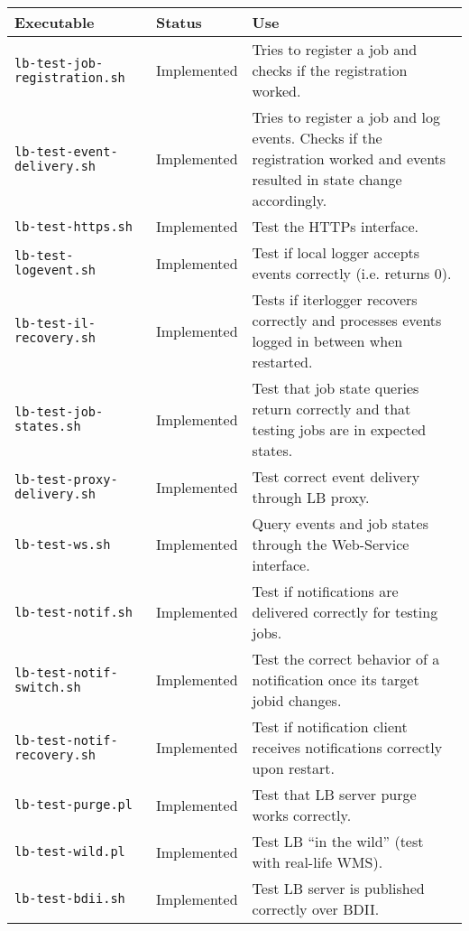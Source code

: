\begin{tabularx}{\textwidth}{|l|l|X|}
\hline
     {\bf Executable} & {\bf Status} & {\bf Use} \\
\hline
{\tt lb-test-job-registration.sh} & Implemented & Tries to register a job and checks if the registration worked. \\
\hline
{\tt lb-test-event-delivery.sh} & Implemented & Tries to register a job and log events. Checks if the registration worked and events resulted in state change accordingly. \\
\hline
{\tt lb-test-https.sh} & Implemented & Test the HTTPs interface. \\
\hline
{\tt lb-test-logevent.sh} & Implemented & Test if local logger accepts events correctly (i.e. returns 0). \\
\hline
{\tt lb-test-il-recovery.sh} & Implemented & Tests if iterlogger recovers correctly and processes events logged in between when restarted. \\
\hline
{\tt lb-test-job-states.sh} & Implemented & Test that job state queries return correctly and that testing jobs are in expected states. \\
\hline
{\tt lb-test-proxy-delivery.sh} & Implemented & Test correct event delivery through LB proxy. \\
\hline
{\tt lb-test-ws.sh} & Implemented & Query events and job states through the Web-Service interface. \\
\hline
{\tt lb-test-notif.sh} & Implemented & Test if notifications are delivered correctly for testing jobs. \\
\hline
{\tt lb-test-notif-switch.sh} & Implemented & Test the correct behavior of a notification once its target jobid changes.  \\
\hline
{\tt lb-test-notif-recovery.sh} & Implemented & Test if notification client receives notifications correctly upon restart.  \\
\hline
{\tt lb-test-purge.pl} & Implemented & Test that LB server purge works correctly. \\
\hline
{\tt lb-test-wild.pl} & Implemented & Test LB ``in the wild'' (test with real-life WMS). \\
\hline
{\tt lb-test-bdii.sh} & Implemented & Test LB server is published correctly over BDII. \\
\hline
\end{tabularx}


